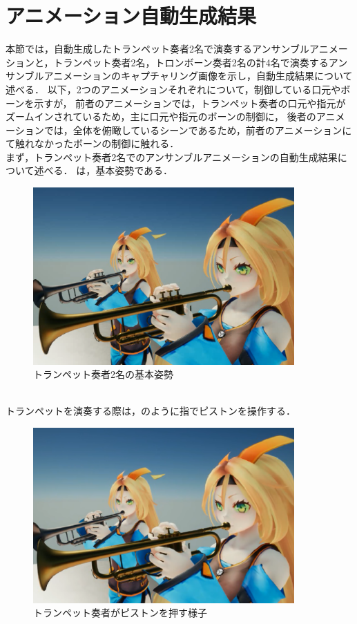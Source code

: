 \section{アニメーション自動生成結果} \label{sec:result}
本節では，自動生成したトランペット奏者2名で演奏するアンサンブルアニメーションと，トランペット奏者2名，トロンボーン奏者2名の計4名で演奏するアンサンブルアニメーションのキャプチャリング画像を示し，自動生成結果について述べる．
以下，2つのアニメーションそれぞれについて，制御している口元やボーンを示すが，
前者のアニメーションでは，トランペット奏者の口元や指元がズームインされているため，主に口元や指元のボーンの制御に，
後者のアニメーションでは，全体を俯瞰しているシーンであるため，前者のアニメーションにて触れなかったボーンの制御に触れる．\\
\indent
まず，トランペット奏者2名でのアンサンブルアニメーションの自動生成結果について述べる．
は，基本姿勢である．
\begin{figure}[!h]
	\centering
	\includegraphics[width=10cm]{fig/chap4/anim1.eps}
	\caption{トランペット奏者2名の基本姿勢}
	\label{fig:anim1}
\end{figure}
\\
トランペットを演奏する際は，のように指でピストンを操作する．
\begin{figure}[!h]
	\centering
	\includegraphics[width=10cm]{fig/chap4/anim1_finger.eps}
	\caption{トランペット奏者がピストンを押す様子}
	\label{fig:anim1_finger}
\end{figure}
